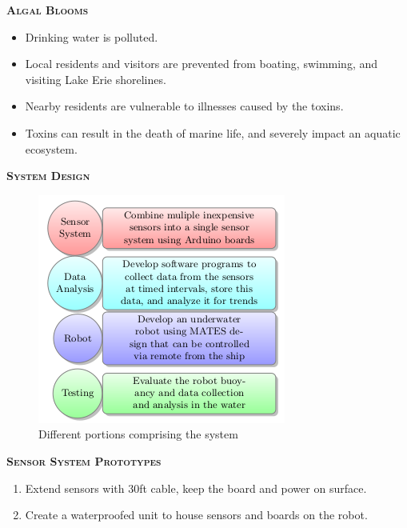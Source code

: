 \documentclass[final,t]{beamer}
\begin{document}
\begin{frame}{}
\begin{columns}
\begin{column}{.5\linewidth}
\begin{block}{\textsc{\textbf{Algal Blooms}}}
                \begin{itemize}
               		\item Drinking water is polluted.
					\item Local residents and visitors are prevented from boating, swimming,
          and visiting Lake Erie shorelines.
					\item Nearby residents are vulnerable to illnesses caused by the toxins.
					\item Toxins can result in the death of marine life, and severely impact
          an aquatic ecosystem.
				\end{itemize}
                    \vspace*{3mm}
                \end{block}
                \begin{alertblock}{\textsc{\textbf{System Design}}}
					   \begin{figure}
                    		\includegraphics[scale = 4]{assets/diagram}
                    	\caption{Different portions comprising the system}
                    	\end{figure}

  					\begin{block}{\textsc{\textbf{Sensor System Prototypes}}}
                    \begin{enumerate}
    	                \item
                    	Extend sensors with 30ft cable, keep the board and power on surface.
						\item  Create a waterproofed unit to house sensors and boards on the robot.
					\end{enumerate}


\end{block}
\end{alertblock}
\end{column}
\end{columns}
\end{frame}
\end{document}
